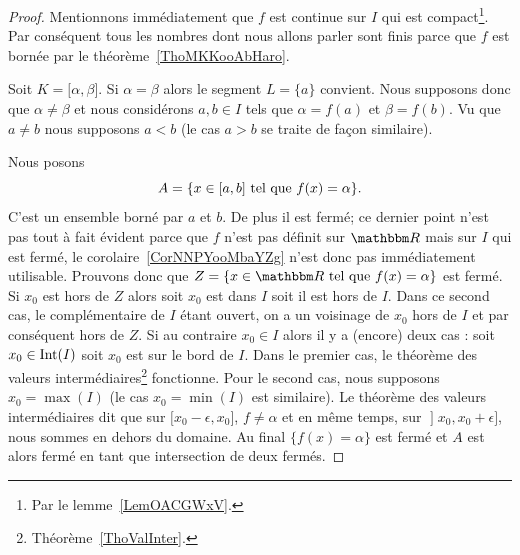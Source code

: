 \begin{proof}
    Mentionnons immédiatement que \( f\) est continue sur \( I\) qui est compact\footnote{Par le lemme~\ref{LemOACGWxV}.}. Par conséquent tous les nombres dont nous allons parler sont finis parce que \( f\) est bornée par le théorème~\ref{ThoMKKooAbHaro}.

    Soit \( K=\mathopen[ \alpha , \beta \mathclose]\). Si \( \alpha=\beta\) alors le segment \( L=\{ a \}\) convient. Nous supposons donc que \( \alpha\neq \beta\) et nous considérons \( a,b\in I\) tels que \( \alpha=f(a)\) et \( \beta=f(b)\). Vu que \( a\neq b\) nous supposons \( a<b\) (le cas \( a>b\) se traite de façon similaire).

    Nous posons
    \begin{equation}
        A=\{ x\in\mathopen[ a , b \mathclose]\text{ tel que } f(x)=\alpha \}.
    \end{equation}
    C'est un ensemble borné par \( a\) et \( b\). De plus il est fermé; ce dernier point n'est pas tout à fait évident parce que \( f\) n'est pas définit sur \( \eR\) mais sur \( I\) qui est fermé, le corolaire~\ref{CorNNPYooMbaYZg} n'est donc pas immédiatement utilisable. Prouvons donc que \( Z=\{ x\in \eR\tq f(x)=\alpha \}\) est fermé. Si \( x_0\) est hors de \( Z\) alors soit \( x_0\) est dans \( I\) soit il est hors de \( I\). Dans ce second cas, le complémentaire de \( I\) étant ouvert, on a un voisinage de \( x_0\) hors de \( I\) et par conséquent hors de \( Z\). Si au contraire \( x_0\in I\) alors il y a (encore) deux cas : soit \( x_0\in\operatorname{Int}(I)\) soit \( x_0\) est sur le bord de \( I\). Dans le premier cas, le théorème des valeurs intermédiaires\footnote{Théorème~\ref{ThoValInter}.} fonctionne. Pour le second cas, nous supposons \( x_0=\max(I)\) (le cas \( x_0=\min(I)\) est similaire). Le théorème des valeurs intermédiaires dit que sur \( \mathopen[ x_0-\epsilon , x_0 \mathclose]\), \( f\neq \alpha\) et en même temps, sur \( \mathopen] x_0 , x_0+\epsilon \mathclose]\), nous sommes en dehors du domaine. Au final \( \{ f(x)=\alpha \}\) est fermé et \( A\) est alors fermé en tant que intersection de deux fermés.


\end{proof}
